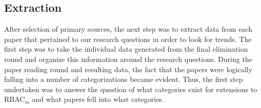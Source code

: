 \subsection{Extraction}

After selection of primary sources, the next step was to extract data from each paper that pertained to our research questions in order to look for trends.  The first step was to take the individual data generated from the final elimination round and organize this information around the research questions.  During the paper reading round and resulting data, the fact that the papers were logically falling into a number of categorizations became evident.  Thus, the first step undertaken was to answer the question of what categories exist for extensions to RBAC$_{m}$ and what papers fell into what categories.
